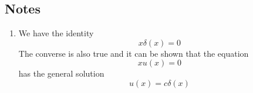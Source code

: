 		\subsection{Notes}
		\begin{enumerate}[label=\textbf{Note : \ \arabic*},start=1]
			\item 
			We have the identity
			\begin{equation}
				x\delta(x) = 0
			\end{equation}
			The converse is also true and it can be shown that the equation
			\begin{equation}
				x u(x) = 0
			\end{equation}
			has the general solution
			\begin{equation}
				u(x) = c \delta(x)
			\end{equation}
			

\end{enumerate}
